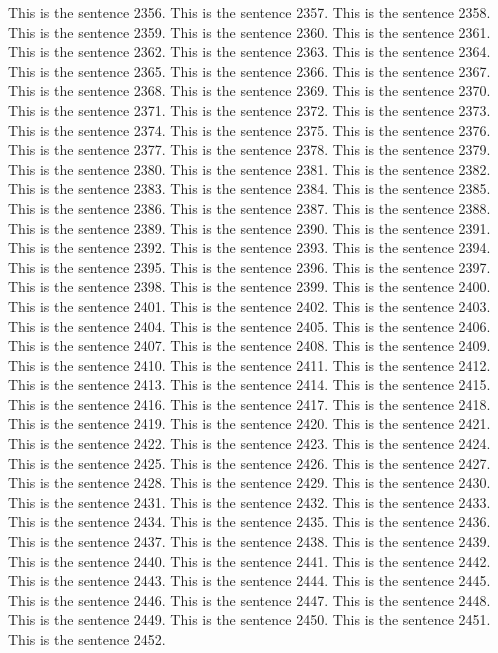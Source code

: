 \documentclass{article}
\begin{document}
This is the sentence 2356.
This is the sentence 2357.
This is the sentence 2358.
This is the sentence 2359.
This is the sentence 2360.
This is the sentence 2361.
This is the sentence 2362.
This is the sentence 2363.
This is the sentence 2364.
This is the sentence 2365.
This is the sentence 2366.
This is the sentence 2367.
This is the sentence 2368.
This is the sentence 2369.
This is the sentence 2370.
This is the sentence 2371.
This is the sentence 2372.
This is the sentence 2373.
This is the sentence 2374.
This is the sentence 2375.
This is the sentence 2376.
This is the sentence 2377.
This is the sentence 2378.
This is the sentence 2379.
This is the sentence 2380.
This is the sentence 2381.
This is the sentence 2382.
This is the sentence 2383.
This is the sentence 2384.
This is the sentence 2385.
This is the sentence 2386.
This is the sentence 2387.
This is the sentence 2388.
This is the sentence 2389.
This is the sentence 2390.
This is the sentence 2391.
This is the sentence 2392.
This is the sentence 2393.
This is the sentence 2394.
This is the sentence 2395.
This is the sentence 2396.
This is the sentence 2397.
This is the sentence 2398.
This is the sentence 2399.
This is the sentence 2400.
This is the sentence 2401.
This is the sentence 2402.
This is the sentence 2403.
This is the sentence 2404.
This is the sentence 2405.
This is the sentence 2406.
This is the sentence 2407.
This is the sentence 2408.
This is the sentence 2409.
This is the sentence 2410.
This is the sentence 2411.
This is the sentence 2412.
This is the sentence 2413.
This is the sentence 2414.
This is the sentence 2415.
This is the sentence 2416.
This is the sentence 2417.
This is the sentence 2418.
This is the sentence 2419.
This is the sentence 2420.
This is the sentence 2421.
This is the sentence 2422.
This is the sentence 2423.
This is the sentence 2424.
This is the sentence 2425.
This is the sentence 2426.
This is the sentence 2427.
This is the sentence 2428.
This is the sentence 2429.
This is the sentence 2430.
This is the sentence 2431.
This is the sentence 2432.
This is the sentence 2433.
This is the sentence 2434.
This is the sentence 2435.
This is the sentence 2436.
This is the sentence 2437.
This is the sentence 2438.
This is the sentence 2439.
This is the sentence 2440.
This is the sentence 2441.
This is the sentence 2442.
This is the sentence 2443.
This is the sentence 2444.
This is the sentence 2445.
This is the sentence 2446.
This is the sentence 2447.
This is the sentence 2448.
This is the sentence 2449.
This is the sentence 2450.
This is the sentence 2451.
This is the sentence 2452.
\end{document}
